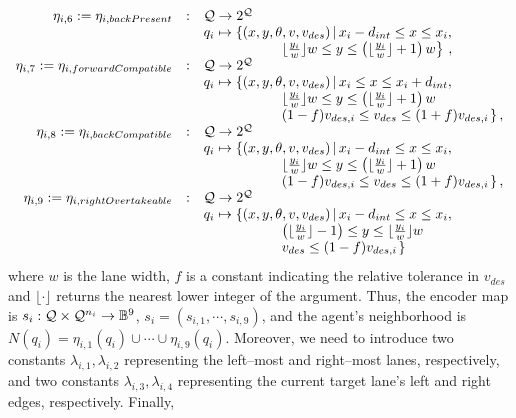 \begin{equation*}
\begin{array}{rcl}
%
\eta_{i,6} := \eta_{i, backPresent} & : & \Q \rightarrow 2^\Q \\
& & q_i \mapsto \left\lbrace (x,y,\theta, v, v_{des}) \, | \, x_i-d_{int} \leq x \leq x_i, \right. \\ & & \;\;\;\;\;\;\;\;\;\;\;\;\;\;\;\;\;\;\;\; \left. \lfloor \frac{y_i}{w} \rfloor w \leq y \leq \left( \lfloor \frac{y_i}{w} \rfloor + 1 \right) w \right\rbrace \, , \\
%
\eta_{i,7} := \eta_{i, forwardCompatible} & : & \Q \rightarrow 2^\Q \\
& & q_i \mapsto \left\lbrace (x,y,\theta, v, v_{des}) \, | \, x_i \leq x \leq x_i + d_{int}, \right. \\ 
 & & \;\;\;\;\;\;\;\;\;\;\;\;\;\;\;\;\;\;\;\; 
\left. \lfloor \frac{y_i}{w} \rfloor w \leq y \leq \left( \lfloor \frac{y_i}{w} \rfloor + 1 \right) w \right. \\ 
& & \;\;\;\;\;\;\;\;\;\;\;\;\;\;\;\;\;\;\;\;
\left. (1 - f)v_{des, i} \leq v_{des} \leq (1+f)v_{des, i} \right.
\rbrace \, , \\
%
\eta_{i,8} := \eta_{i, backCompatible} & : & \Q \rightarrow 2^\Q \\
& & q_i \mapsto \left\lbrace (x,y,\theta, v, v_{des}) \, | \, x_i - d_{int}\leq x \leq x_i, \right. \\ 
 & & \;\;\;\;\;\;\;\;\;\;\;\;\;\;\;\;\;\;\;\; 
\left. \lfloor \frac{y_i}{w} \rfloor w \leq y \leq \left( \lfloor \frac{y_i}{w} \rfloor + 1 \right) w \right. \\ 
& & \;\;\;\;\;\;\;\;\;\;\;\;\;\;\;\;\;\;\;\;
\left. (1 - f)v_{des, i} \leq v_{des} \leq (1+f)v_{des, i} \right.
\rbrace \, , \\
%
\eta_{i,9} := \eta_{i, rightOvertakeable} & : & \Q \rightarrow 2^\Q \\
& & q_i \mapsto \left\lbrace (x,y,\theta, v, v_{des}) \, | \, x_i - d_{int}\leq x \leq x_i, \right. \\ 
 & & \;\;\;\;\;\;\;\;\;\;\;\;\;\;\;\;\;\;\;\; 
\left. \left( \lfloor \frac{y_i}{w} \rfloor - 1 \right) \leq y \leq \lfloor \frac{y_i}{w} \rfloor w \right. \\ 
& & \;\;\;\;\;\;\;\;\;\;\;\;\;\;\;\;\;\;\;\;
\left. v_{des} \leq (1-f)v_{des, i} \right.
\rbrace \,  \\

 
 
\end{array}
\end{equation*}
where $w$ is the lane width, {\color{red}$f$ is a constant indicating the relative tolerance in $v_{des}$} and $\lfloor \cdot \rfloor$ returns the nearest lower integer of the argument. Thus, the encoder map is $s_i :  \mathcal{Q} \times \mathcal{Q}^{n_i} \rightarrow \Bbb{B}^9$, $s_i = (s_{i,1}, \cdots, s_{i,9})$, and the agent's neighborhood is $N(q_i) = \eta_{i,1}(q_i) \cup \cdots \cup \eta_{i,9}(q_i)$. Moreover, we need to introduce two constants $\lambda_{i,1}, \lambda_{i,2}$ representing the left--most and right--most lanes, respectively, and two constants $\lambda_{i,3}, \lambda_{i,4}$ representing the current target lane's left and right edges, respectively. Finally, 
